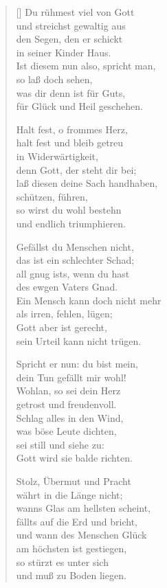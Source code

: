 \begin{multicols}{2}
\begin{verse}[\versewidth]
   Du rühmest viel von Gott\\
  und streichst gewaltig aus\\
  den Segen, den er schickt\\
  in seiner Kinder Haus.\\
  Ist diesem nun also, spricht man,\\
  so laß doch sehen,\\
  was dir denn ist für Guts,\\
  für Glück und Heil geschehen.

   Halt fest, o frommes Herz,\\
  halt fest und bleib getreu\\
  in Widerwärtigkeit,\\
  denn Gott, der steht dir bei;\\
  laß diesen deine Sach handhaben,\\
  schützen, führen,\\
  so wirst du wohl bestehn\\
  und endlich triumphieren.

\vfill\null
\columnbreak

   Gefällst du Menschen nicht,\\
  das ist ein schlechter Schad;\\
  all gnug ists, wenn du hast\\
  des ewgen Vaters Gnad.\\
  Ein Mensch kann doch nicht mehr\\
  als irren, fehlen, lügen;\\
  Gott aber ist gerecht,\\
  sein Urteil kann nicht trügen.

   Spricht er nun: du bist mein,\\
  dein Tun gefällt mir wohl!\\
  Wohlan, so sei dein Herz\\
  getrost und freudenvoll.\\
  Schlag alles in den Wind,\\
  was böse Leute dichten,\\
  sei still und siehe zu:\\
  Gott wird sie balde richten.

   Stolz, Übermut und Pracht\\
  währt in die Länge nicht;\\
  wanns Glas am hellsten scheint,\\
  fällts auf die Erd und bricht,\\
  und wann des Menschen Glück\\
  am höchsten ist gestiegen,\\
  so stürzt es unter sich\\
  und muß zu Boden liegen.


\end{verse}
\end{multicols}
